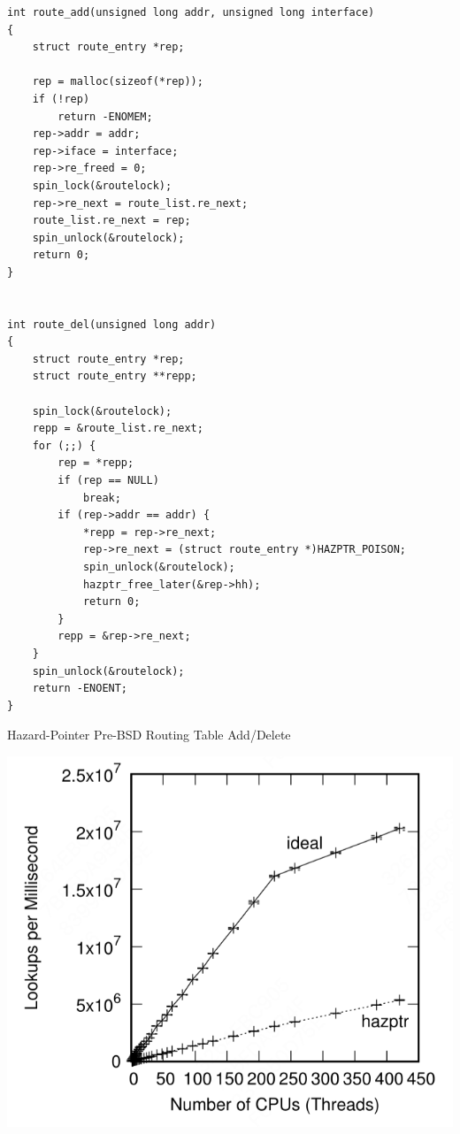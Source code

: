 \documentclass[11pt]{article}
\begin{document}
\begin{listing}[htbp]
\begin{verbatim}
int route_add(unsigned long addr, unsigned long interface)
{
    struct route_entry *rep;

    rep = malloc(sizeof(*rep));
    if (!rep)
        return -ENOMEM;
    rep->addr = addr;
    rep->iface = interface;
    rep->re_freed = 0;
    spin_lock(&routelock);
    rep->re_next = route_list.re_next;
    route_list.re_next = rep;
    spin_unlock(&routelock);
    return 0;
}


int route_del(unsigned long addr)
{
    struct route_entry *rep;
    struct route_entry **repp;

    spin_lock(&routelock);
    repp = &route_list.re_next;
    for (;;) {
        rep = *repp;
        if (rep == NULL)
            break;
        if (rep->addr == addr) {
            *repp = rep->re_next;
            rep->re_next = (struct route_entry *)HAZPTR_POISON;
            spin_unlock(&routelock);
            hazptr_free_later(&rep->hh);
            return 0;
        }
        repp = &rep->re_next;
    }
    spin_unlock(&routelock);
    return -ENOENT;
}
\end{verbatim}
\caption{\label{l9.7}Hazard-Pointer Pre-BSD Routing Table Add/Delete}
\end{listing}

\begin{center}
\includegraphics[width=.88\textwidth]{../images/perfbook/56.png}
\end{center}
\end{document}
